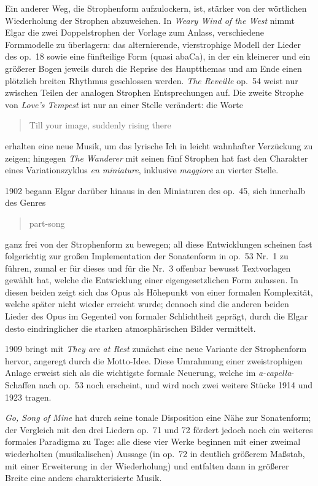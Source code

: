 \documentclass[a4paper,11pt,open=any]{scrbook}
\newcommand{\engquote}[1]{\foreignblockquote{english}{#1}}
\begin{document}
Ein anderer Weg, die Strophenform aufzulockern, ist, stärker von der
wörtlichen Wiederholung der Strophen abzuweichen.  In \textit{Weary Wind
of the West} nimmt Elgar die zwei Doppelstrophen der Vorlage zum Anlass,
verschiedene Formmodelle zu überlagern: das alternierende, vierstrophige
Modell der Lieder des op.~18 sowie eine fünfteilige Form (quasi \textsf{abaCa}),
in der ein kleinerer und ein größerer Bogen jeweils durch die Reprise des
Hauptthemas und am Ende einen plötzlich breiten Rhythmus geschlossen werden.
\textit{The Reveille} op.~54 weist nur zwischen Teilen der analogen Strophen
Entsprechungen auf.  Die zweite Strophe von \textit{Love’s Tempest} ist nur
an einer Stelle verändert: die Worte \engquote{Till your image, suddenly
rising there} erhalten eine neue Musik, um das lyrische Ich in leicht
wahnhafter Verzückung zu zeigen; hingegen \textit{The Wanderer} mit seinen
fünf Strophen hat fast den Charakter eines Variationszyklus \textit{en
miniature}, inklusive \textit{maggiore} an vierter Stelle.

1902 begann Elgar darüber hinaus in den Miniaturen des op.~45, sich innerhalb
des Genres \engquote{part-song} ganz frei von der Strophenform zu bewegen;
all diese Entwicklungen scheinen fast folgerichtig zur großen Implementation
der Sonatenform in op.~53 Nr.~1 zu führen, zumal er für dieses und für die
Nr.~3 offenbar bewusst Textvorlagen gewählt hat, welche die Entwicklung
einer eigengesetzlichen Form zulassen.  In diesen beiden zeigt sich das Opus
als Höhepunkt von einer formalen Komplexität, welche später nicht wieder
erreicht wurde;  dennoch sind die anderen beiden Lieder des Opus im Gegenteil
von formaler Schlichtheit geprägt, durch die Elgar desto eindringlicher die
starken atmosphärischen Bilder vermittelt.

1909 bringt mit \textit{They are at Rest} zunächst eine neue Variante der
Strophenform hervor, angeregt durch die Motto-Idee.  Diese Umrahmung einer
zweistrophigen Anlage erweist sich als die wichtigste formale Neuerung,
welche im \textit{a-capella}-Schaffen nach op.~53 noch erscheint, und wird
noch zwei weitere Stücke 1914 und 1923 tragen.

\textit{Go, Song of Mine} hat durch seine tonale Disposition eine Nähe
zur Sonatenform; der Vergleich mit den drei Liedern op.~71 und 72 fördert
jedoch noch ein weiteres formales Paradigma zu Tage: alle diese vier Werke
beginnen mit einer zweimal wiederholten (musikalischen) Aussage (in op.~72
in deutlich größerem Maßstab, mit einer Erweiterung in der Wiederholung)
und entfalten dann in größerer Breite eine anders charakterisierte Musik.
\end{document}
